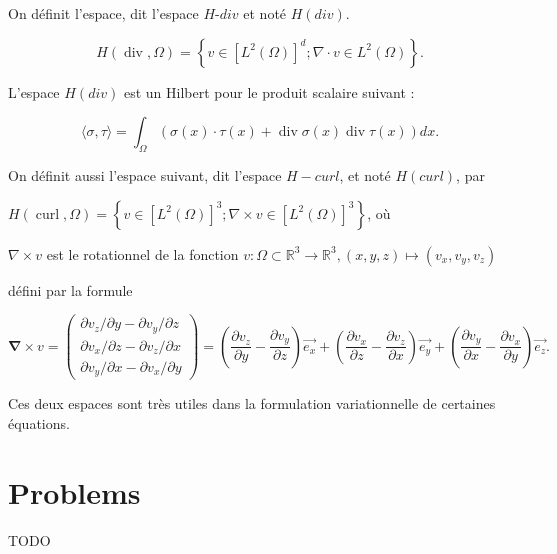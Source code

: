 On définit l'espace,  dit l'espace $H$-$div$ et noté $H(div)$.

$$H\left(\operatorname{div} , \Omega\right)=\left\{v \in\left[L^{2}\left(\Omega\right)\right]^{d} ; \nabla \cdot v \in L^{2}\left(\Omega\right)\right\}.
$$

L'espace $H(div)$ est un Hilbert pour le produit scalaire suivant :


$$
\langle\sigma, \tau\rangle=\int_{\Omega}(\sigma(x) \cdot \tau(x)+\operatorname{div} \sigma(x) \operatorname{div} \tau(x)) d x.
$$


On définit aussi l'espace suivant, dit l'espace $H-curl$, et noté $H(curl)$, par 

$H\left(\operatorname{curl} , \Omega\right)=\left\{v \in\left[L^{2}\left(\Omega\right)\right]^{3} ; \nabla \times v \in\left[L^{2}\left(\Omega\right)\right]^{3}\right\}$, où 

$\nabla \times v$ est le rotationnel de la fonction $v:\Omega\subset \mathbb{R}^3\longrightarrow  \mathbb{R}^3,   (x,y,z)\longmapsto (v_x,v_y,v_z)$


défini par la formule

$$
\boldsymbol{\nabla} \times  v=\left(\begin{array}{c}
	\partial v_{z} / \partial y-\partial v_{y} / \partial z \\
	\partial v	_{x} / \partial z-\partial v_{z} / \partial x \\
	\partial v_{y} / \partial x-\partial v_{x} / \partial y
\end{array}\right) =\left(\frac{\partial v_{z}}{\partial y}-\frac{\partial v_{y}}{\partial z}\right) \overrightarrow{e_{x}}+\left(\frac{\partial v_{x}}{\partial z}-\frac{\partial v_{z}}{\partial x}\right) \overrightarrow{e_{y}}+\left(\frac{\partial v_{y}}{\partial x}-\frac{\partial v_{x}}{\partial y}\right) \overrightarrow{e_{z}}.
$$

Ces deux espaces sont très utiles dans la formulation variationnelle de certaines équations.

\section{Problems}

\begin{exercise}
  TODO
\end{exercise}


